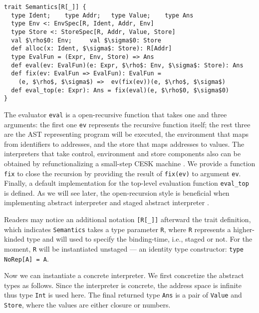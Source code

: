 
\begin{lstlisting}
trait Semantics[R[_]] {
  type Ident;    type Addr;   type Value;    type Ans
  type Env <: EnvSpec[R, Ident, Addr, Env]
  type Store <: StoreSpec[R, Addr, Value, Store]
  val $\rho$0: Env;     val $\sigma$0: Store
  def alloc(x: Ident, $\sigma$: Store): R[Addr]
  type EvalFun = (Expr, Env, Store) => Ans
  def eval(ev: EvalFun)(e: Expr, $\rho$: Env, $\sigma$: Store): Ans
  def fix(ev: EvalFun => EvalFun): EvalFun = 
    (e, $\rho$, $\sigma$) =>  ev(fix(ev))(e, $\rho$, $\sigma$)
  def eval_top(e: Expr): Ans = fix(eval)(e, $\rho$0, $\sigma$0)
}
\end{lstlisting}

The evaluator \texttt{eval} is a open-recursive function that takes one and three arguments: the first
one \texttt{ev} represents the recursive function itself; the rest three are the AST representing program 
will be executed, the environment that maps from identifiers to addresses, and the store that maps addresses to values.
The interpreters that take control, environment and store components also can be obtained by 
refunctionalizing \cite{DBLP:conf/ppdp/AgerBDM03, Wei:2018:RAA:3243631.3236800} a small-step CESK 
machine \cite{DBLP:conf/popl/FelleisenF87}.
We provide a function \texttt{fix} to close the recursion by providing the result of \texttt{fix(ev)} 
to argument \texttt{ev}. Finally, a default implementation for the top-level evaluation function \texttt{eval\_top} is defined.
As we will see later, the open-recursion style is beneficial when implementing abstract interpreter and 
staged abstract interpreter .

Readers may notice an additional notation \texttt{[R[\_]]} afterward the trait definition,
which indicates \texttt{Semantics} takes a type parameter \texttt{R}, where \texttt{R} represents
a higher-kinded type and will used to specify the binding-time, i.e., staged or not. 
For the moment, \texttt{R} will be instantiated unstaged --- an identity type constructor: 
\texttt{type NoRep[A] = A}. 

Now we can instantiate a concrete interpreter. We first concretize the abstract types as follows.
Since the interpreter is concrete, the address space is infinite thus type \texttt{Int} is used here.
The final returned type \texttt{Ans} is a pair of \texttt{Value} and \texttt{Store}, where
the values are either closure or numbers.

